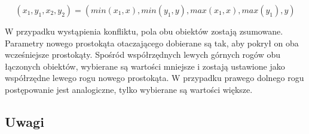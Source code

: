     \begin{equation}
        (x_{1}, y_{1}, x_{2}, y_{2})= (min(x_{1}, x), min(y_{1}, y), max(x_{1}, x), max(y_{1}), y)
    \label{equ:labeling_bbox_update}
    \end{equation}

\noindent
W przypadku wystąpienia konfliktu, pola obu obiektów zostają zsumowane. Parametry nowego prostokąta otaczającego dobierane są tak, aby pokrył on oba wcześniejsze prostokąty. Spośród współrzędnych lewych górnych rogów obu łączonych obiektów, wybierane są wartości mniejsze i zostają ustawione jako współrzędne lewego rogu nowego prostokąta. W przypadku prawego dolnego rogu postępowanie jest analogiczne, tylko wybierane są wartości większe.



\subsection{Uwagi}
\label{subsec:pbas_uwagi}

